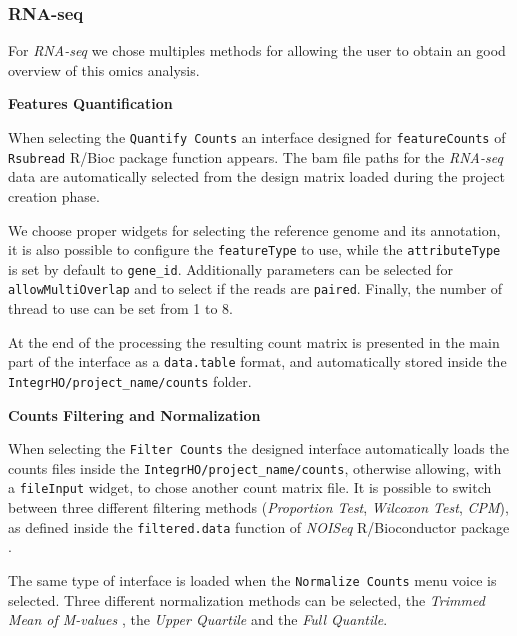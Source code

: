 \subsubsection{RNA-seq}
For \textit{RNA-seq} we chose multiples methods for allowing the user to obtain an good overview of this omics analysis.


{\setlength{\parindent}{0cm}\textbf{Features Quantification}}

When selecting the \lstinline!Quantify Counts! an interface designed for \lstinline!featureCounts! of \lstinline!Rsubread! R/Bioc package function \cite{Liao2014} appears.
The  \gls{bam} file paths for the \textit{RNA-seq} data are automatically selected from the   design matrix loaded during the project creation phase.

We choose proper widgets for selecting the reference genome and its annotation, it is also possible to configure the \lstinline!featureType! to use, while the \lstinline!attributeType! is set by default to \lstinline!gene_id!.
Additionally parameters can be selected for \lstinline!allowMultiOverlap! and to select if the reads are \lstinline!paired!.
Finally, the number of thread to use can be set from 1 to 8.

At the end of the processing the resulting count matrix is presented in the main part of the interface as a \lstinline!data.table! format, and automatically stored inside the \lstinline!IntegrHO/project_name/counts! folder.


{\setlength{\parindent}{0cm}\textbf{Counts Filtering and Normalization}}

When selecting the \lstinline!Filter Counts! the designed interface automatically loads the counts files inside the \lstinline!IntegrHO/project_name/counts!, otherwise allowing, with a \lstinline!fileInput! widget, to chose another count matrix file.
It is possible to switch between three different filtering methods (\textit{Proportion Test}, \textit{Wilcoxon Test}, \textit{CPM}), as defined inside the \lstinline!filtered.data! function of \textit{NOISeq} R/Bioconductor package \cite{Tarazona2012}.

The same type of interface is loaded when the \lstinline!Normalize Counts! menu voice is selected.
Three different normalization methods can be selected, the \textit{Trimmed Mean of M-values} \cite{Robinson2010}, the \textit{Upper Quartile} and the \textit{Full Quantile}.

